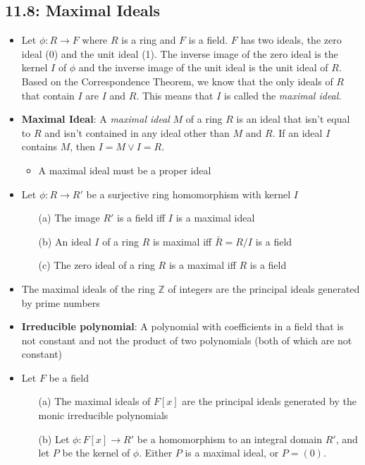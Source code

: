 \documentclass[12pt]{article}
\begin{document}
\subsection*{11.8: Maximal Ideals}
\begin{itemize}
  \item Let $\phi: R \to F$ where $R$ is a ring and $F$ is a field. $F$ has two ideals, the zero ideal (0) and the unit ideal (1). The inverse image of the zero ideal is the kernel $I$ of $\phi$ and the inverse image of the unit ideal is the unit ideal of $R$. Based on the Correspondence Theorem, we know that the only ideals of $R$ that contain $I$ are $I$ and $R$. This means that $I$ is called the \textit{maximal ideal}.
  \item \textbf{Maximal Ideal}: A \textit{maximal ideal} $M$ of a ring $R$ is an ideal that isn't equal to $R$ and isn't contained in any ideal other than $M$ and $R$. If an ideal $I$ contains $M$, then $I = M \lor I = R$.
  \begin{itemize}
    \item A maximal ideal must be a proper ideal
  \end{itemize}
  \item Let $\phi: R \to R'$ be a surjective ring homomorphism with kernel $I$
  \begin{enumerate}
    \item[(a)] The image $R'$ is a field iff $I$ is a maximal ideal
    \item[(b)] An ideal $I$ of a ring $R$ is maximal iff $\bar{R} = R/I$ is a field
    \item[(c)] The zero ideal of a ring $R$ is a maximal iff $R$ is a field
  \end{enumerate}
  \item The maximal ideals of the ring $\mathbb{Z}$ of integers are the principal ideals generated by prime numbers
  \item \textbf{Irreducible polynomial}: A polynomial with coefficients in a field that is not constant and not the product of two polynomials (both of which are not constant)
  \item Let $F$ be a field
  \begin{enumerate}
    \item[(a)] The maximal ideals of $F[x]$ are the principal ideals generated by the monic irreducible polynomials
    \item[(b)] Let $\phi: F[x] \to R'$ be a homomorphism to an integral domain $R'$, and let $P$ be the kernel of $\phi$. Either $P$ is a maximal ideal, or $P = (0)$.

\end{enumerate}
\end{itemize}
\end{document}
